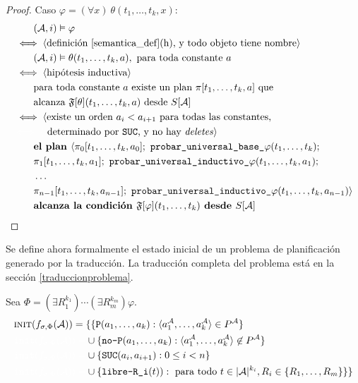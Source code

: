 \begin{proof}
Caso $\varphi = (\forall x)\ \theta(t_1,\ldots,t_k,x):$
\begin{alignat*}{1}
& \quad \quad (\A, i) \models \varphi\\
& \iff \tup{\text{definición \ref{semantica_def}(h), y todo objeto tiene nombre}}\\
& \quad \quad (\A, i) \models \theta(t_1,\ldots,t_k,a), \text{ para toda
constante $a$}\\
& \iff \tup{\text{hipótesis inductiva}}\\
& \quad\quad \text{para toda constante $a$ existe un plan $\pi[t_1,\ldots,t_k,a]$ que}\\
& \quad\quad \text{alcanza $\FT[\theta](t_1,\ldots,t_k,a)$ desde } S[\A]\\
& \iff \langle \text{existe un orden $a_i < a_{i+1}$ para todas las constantes,}\\
& {\color{white} \iff \langle} \text{ determinado por \texttt{SUC}, y no hay
\textit{deletes}} \rangle\\
& \quad \quad \textbf{el plan } \langle \pi_0[t_1,\ldots,t_k,a_0];\
\texttt{probar\_universal\_base\_}\varphi(t_1,\ldots,t_k);\\
& \quad \quad \pi_1[t_1,\ldots,t_k,a_1];\
\texttt{probar\_universal\_inductivo\_}\varphi(t_1,\ldots,t_k,a_1);\\
& \quad \quad \ldots\ \\
& \quad \quad \pi_{n-1}[t_1,\ldots,t_k,a_{n-1}];\
\texttt{probar\_universal\_inductivo\_}\varphi(t_1,\ldots,t_k,a_{n-1}) \rangle\\
& \quad \quad \textbf{alcanza la condición } \FT[\varphi](t_1,\ldots,t_k)
\textbf{ desde } S[\A]
\end{alignat*}
\end{proof}

Se define ahora formalmente el estado inicial de un problema de planificación
generado por la traducción. La traducción completa del
problema está en la sección \ref{traduccionproblema}.

\begin{definition}
Sea $\Phi = (\exists R_1^{k_1})\cdots(\exists R_m^{k_m}) \varphi$.
\begin{alignat*}{1}
& \textsc{init}(f_{\sigma,\Phi}(\A)) = \{\{ \texttt{P}(a_1,\ldots,a_k) :
\tup{a_1^\A,\ldots,a_k^\A} \in P^\A\}\\
& {\color{white} \texttt{init}(f_{\sigma,\Phi}(\A)) = } \cup \{\texttt{no-P}(a_1,\ldots,a_k) : \tup{a_1^\A,\ldots,a_k^\A} \not\in P^\A\}\\
& {\color{white} \texttt{init}(f_{\sigma,\Phi}(\A)) = } \cup \{\texttt{SUC}(a_i, a_{i+1}) : 0 \leq i < n \} \\
& {\color{white} \texttt{init}(f_{\sigma,\Phi}(\A)) = } \cup
\{\texttt{libre-R\_i}(t)) : \text{ para todo $t \in |\A|^{k_i}$},
R_i\in\{R_1,\ldots,R_m\}\} \}
\end{alignat*}
\end{definition}

